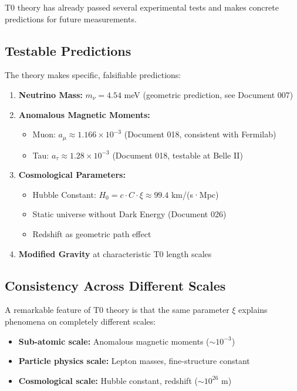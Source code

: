 	T0 theory has already passed several experimental tests and makes concrete predictions for future measurements.
	
	\subsection{Testable Predictions}
	
	\begin{keyresult}
		The theory makes specific, falsifiable predictions:
		\begin{enumerate}
			\item \textbf{Neutrino Mass:} $m_\nu = 4.54$ meV (geometric prediction, see Document 007)
			
			\item \textbf{Anomalous Magnetic Moments:}
			\begin{itemize}
				\item Muon: $a_\mu \approx 1.166 \times 10^{-3}$ (Document 018, consistent with Fermilab)
				\item Tau: $a_\tau \approx 1.28 \times 10^{-3}$ (Document 018, testable at Belle II)
			\end{itemize}
			
			\item \textbf{Cosmological Parameters:}
			\begin{itemize}
				\item Hubble Constant: $H_0 = c \cdot C \cdot \xi \approx 99.4$ km/(s·Mpc)
				\item Static universe without Dark Energy (Document 026)
				\item Redshift as geometric path effect
			\end{itemize}
			
			\item \textbf{Modified Gravity} at characteristic T0 length scales
		\end{enumerate}
	\end{keyresult}
	
	\subsection{Consistency Across Different Scales}
	
	A remarkable feature of T0 theory is that the same parameter $\xi$ explains phenomena on completely different scales:
	
	\begin{itemize}
		\item \textbf{Sub-atomic scale:} Anomalous magnetic moments ($\sim 10^{-3}$)
		\item \textbf{Particle physics scale:} Lepton masses, fine-structure constant
		\item \textbf{Cosmological scale:} Hubble constant, redshift ($\sim 10^{26}$ m)
	\end{itemize}
	
